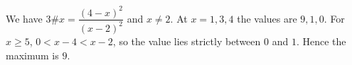 We have $3\#x=\dfrac{(4-x)^2}{(x-2)^2}$ and $x\ne 2$. At $x=1,3,4$ the values are $9,1,0$. For $x\ge 5$, $0<x-4<x-2$, so the value lies strictly between $0$ and $1$. Hence the maximum is $\boxed 9$.

